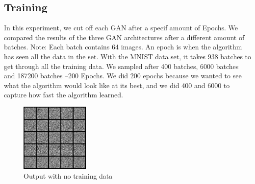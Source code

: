 \documentclass[12pt,
 reprint,
nofootinbib,
 amsmath,amssymb,
 aps,
floatfix,
]{revtex4-2}
\begin{document}
\subsection{\label{sec:expTime}Training}

In this experiment, we cut off each GAN after a specif amount of Epochs. We compared the results of the three GAN architectures after a different amount of batches. Note: Each batch contains 64 images. An epoch is when the algorithm has seen all the data in the set. With the MNIST data set, it takes 938 batches to get through all the training data. We sampled after 400 batches, 6000 batches and 
187200 batches --200 Epochs. We did 200 epochs because we wanted to see what the algorithm would look like at its best, and we did 400 and 6000 to capture how fast the algorithm learned.

\begin{figure}[h!]
    \centering
    \includegraphics[width=0.3\textwidth]{results/0.png}
    \caption{Output with no training data}%
    \label{fig:noData}%
\end{figure}
\end{document}
